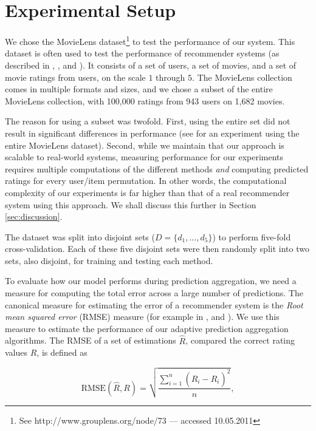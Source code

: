 \section{Experimental Setup}

We chose the MovieLens dataset\footnote{
See http://www.grouplens.org/node/73 --- accessed 10.05.2011}
to test the performance of our system.
This dataset is often used to test the performance of recommender systems
(as described in 
\cite[p.9]{Alshamri2008}, \cite[p.4]{Lemire2005}, \cite[p.1]{Adomavicius2005} and \cite[p.2]{Herlocker2004}).
It consists of a set of users, a set of movies, and a set of movie ratings from users,
on the scale $1$ through $5$.
The MovieLens collection comes in multiple formats and sizes,
and we chose a subset of the entire MovieLens collection, with 100,000 ratings from 943 users on 1,682 movies.

The reason for using a subset was twofold.
First, using the entire set did not result in 
significant differences in performance (see \cite[p.63]{Bjorkoy2011}
for an experiment using the entire MovieLens dataset).
Second, while we maintain that our approach is scalable to real-world systems,
measuring performance for our experiments requires 
multiple computations of the different methods \emph{and}
computing predicted ratings for every user/item permutation.
In other words, the computational complexity of our experiments
is far higher than that of a real recommender system using this approach.
We shall discuss this further in Section \ref{sec:discussion}.

The dataset was split into disjoint sets
($D = \{ d_1, ..., d_5 \}$) to perform five-fold cross-validation.
Each of these five disjoint sets were then randomly split into
two sets, also disjoint, for training and testing each method.

To evaluate how our model performs during prediction aggregation, 
we need a measure for computing the total error across a large number of predictions.
The canonical measure for estimating the error of a recommender system
is the \emph{Root mean squared error} (RMSE) measure
(for example in \cite[p.17]{Herlocker2004}, \cite[p.13]{Adomavicius2005} and \cite[p.6]{Bell2007}).
We use this measure to estimate the performance
of our adaptive prediction aggregation algorithms.
The RMSE of a set of estimations $\hat{R}$, 
compared the correct rating values $R$, is defined as

\begin{equation}
  \mathrm{RMSE}(\hat{R},R)
  = \sqrt{\frac{
      \sum_{i=1}^{n} (\hat{R}_i - R_i)^2
    }{
      n
    }},
\end{equation}

